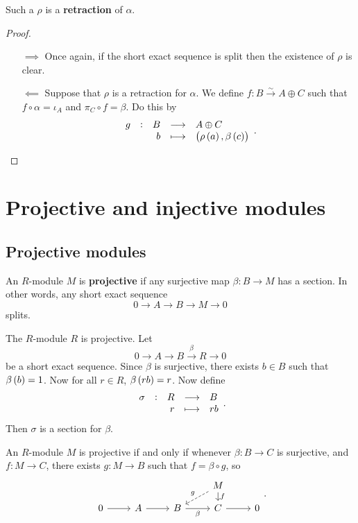 Such a $ \rho $ is a \textbf{retraction} of $ \alpha $.

\begin{proof}
\hfill
\begin{itemize}
\item[$ \implies $] Once again, if the short exact sequence is split then the existence of $ \rho $ is clear.
\item[$ \impliedby $] Suppose that $ \rho $ is a retraction for $ \alpha $. We define $ f : B \xrightarrow{\sim} A \oplus C $ such that $ f \circ \alpha = \iota_A $ and $ \pi_C \circ f = \beta $. Do this by
$$ \function[g]{B}{A \oplus C}{b}{\br{\rho\br{a}, \beta\br{c}}}. $$
\end{itemize}
\end{proof}

\pagebreak

\section{Projective and injective modules}

\subsection{Projective modules}


\begin{definition}
An $ R $-module $ M $ is \textbf{projective} if any surjective map $ \beta : B \to M $ has a section. In other words, any short exact sequence
$$ 0 \to A \to B \to M \to 0 $$
splits.
\end{definition}

\begin{example*}
The $ R $-module $ R $ is projective. Let
$$ 0 \to A \to B \xrightarrow{\beta} R \to 0 $$
be a short exact sequence. Since $ \beta $ is surjective, there exists $ b \in B $ such that $ \beta\br{b} = 1 $. Now for all $ r \in R $, $ \beta\br{rb} = r $. Now define
$$ \function[\sigma]{R}{B}{r}{rb}. $$
Then $ \sigma $ is a section for $ \beta $.
\end{example*}

\begin{proposition}
An $ R $-module $ M $ is projective if and only if whenever $ \beta : B \to C $ is surjective, and $ f : M \to C $, there exists $ g : M \to B $ such that $ f = \beta \circ g $, so
$$
\begin{tikzcd}[row sep=small]
& & & M \arrow[dashed]{dl}[swap]{g} \arrow{d}{f} & \\
0 \arrow{r} & A \arrow{r} & B \arrow{r}[swap]{\beta} & C \arrow{r} & 0
\end{tikzcd}.
$$
\end{proposition}

